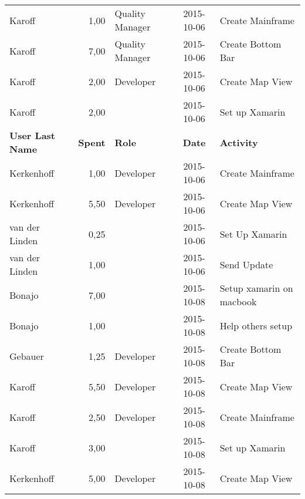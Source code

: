 \begin{longtable}{ l r p{2cm} c p{4cm}}
		Karoff                  & 1,00           & Quality Manager & 2015-10-06    & Create Mainframe                                \\
		Karoff                  & 7,00           & Quality Manager & 2015-10-06    & Create Bottom Bar                               \\
		Karoff                  & 2,00           & Developer       & 2015-10-06    & Create Map View                                 \\
		Karoff                  & 2,00           &                 & 2015-10-06    & Set up Xamarin                                  \\
		\textbf{User Last Name} & \textbf{Spent} & \textbf{Role} & \textbf{Date} & \textbf{Activity} \\
		\hline
		Kerkenhoff              & 1,00           & Developer       & 2015-10-06    & Create Mainframe                                \\
		Kerkenhoff              & 5,50           & Developer       & 2015-10-06    & Create Map View                                 \\
		van der Linden          & 0,25           &                 & 2015-10-06    & Set Up Xamarin                                  \\
		van der Linden          & 1,00           &                 & 2015-10-06    & Send Update                                     \\
		Bonajo                  & 7,00           &                 & 2015-10-08    & Setup xamarin on macbook                        \\
		Bonajo                  & 1,00           &                 & 2015-10-08    & Help others setup                               \\
		Gebauer                 & 1,25           & Developer       & 2015-10-08    & Create Bottom Bar                               \\
		Karoff                  & 5,50           & Developer       & 2015-10-08    & Create Map View                                 \\
		Karoff                  & 2,50           & Developer       & 2015-10-08    & Create Mainframe                                \\
		Karoff                  & 3,00           &                 & 2015-10-08    & Set up Xamarin                                  \\
		Kerkenhoff              & 5,00           & Developer       & 2015-10-08    & Create Map View                                 \\

\end{longtable}
